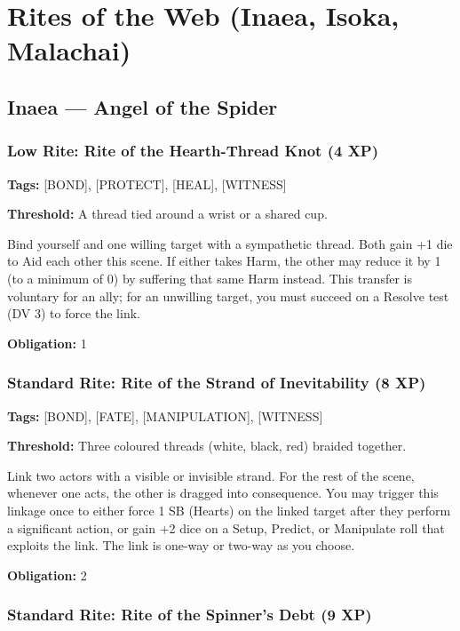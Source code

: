 \section{Rites of the Web (Inaea, Isoka, Malachai)}

\subsection{Inaea — Angel of the Spider}

\subsubsection{Low Rite: Rite of the Hearth-Thread Knot (4 XP)}

\textbf{Tags:} [BOND], [PROTECT], [HEAL], [WITNESS]

\textbf{Threshold:} A thread tied around a wrist or a shared cup.

Bind yourself and one willing target with a sympathetic thread. Both gain +1 die to Aid each other this scene. If either takes Harm, the other may reduce it by 1 (to a minimum of 0) by suffering that same Harm instead. This transfer is voluntary for an ally; for an unwilling target, you must succeed on a Resolve test (DV 3) to force the link.

\textbf{Obligation:} 1

\subsubsection{Standard Rite: Rite of the Strand of Inevitability (8 XP)}

\textbf{Tags:} [BOND], [FATE], [MANIPULATION], [WITNESS]

\textbf{Threshold:} Three coloured threads (white, black, red) braided together.

Link two actors with a visible or invisible strand. For the rest of the scene, whenever one acts, the other is dragged into consequence. You may trigger this linkage once to either force 1 SB (Hearts) on the linked target after they perform a significant action, or gain +2 dice on a Setup, Predict, or Manipulate roll that exploits the link. The link is one-way or two-way as you choose.

\textbf{Obligation:} 2

\subsubsection{Standard Rite: Rite of the Spinner's Debt (9 XP)}


